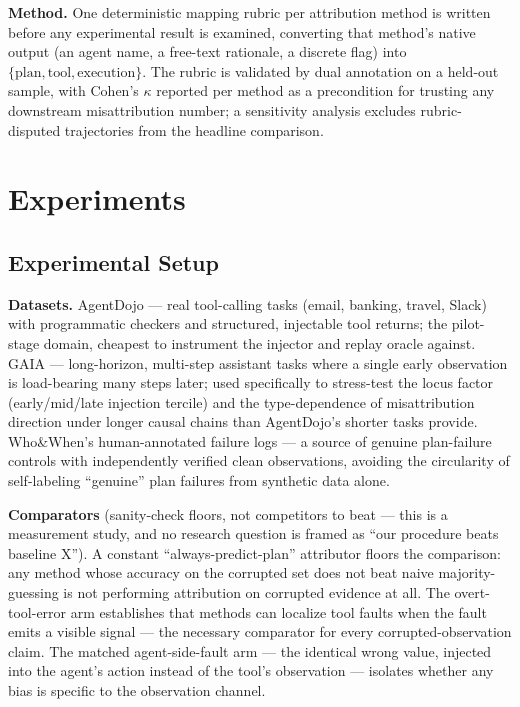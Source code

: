 \documentclass[11pt]{article}
\begin{document}
\textbf{Method.} One deterministic mapping rubric per attribution method is written before any experimental result is examined, converting that method's native output (an agent name, a free-text rationale, a discrete flag) into $\{\text{plan}, \text{tool}, \text{execution}\}$. The rubric is validated by dual annotation on a held-out sample, with Cohen's $\kappa$ reported per method as a precondition for trusting any downstream misattribution number; a sensitivity analysis excludes rubric-disputed trajectories from the headline comparison.

\section{Experiments}

\subsection{Experimental Setup}

\textbf{Datasets.} AgentDojo \citep{AgentDojo240613352} --- real tool-calling tasks (email, banking, travel, Slack) with programmatic checkers and structured, injectable tool returns; the pilot-stage domain, cheapest to instrument the injector and replay oracle against. GAIA \citep{GAIA231112983} --- long-horizon, multi-step assistant tasks where a single early observation is load-bearing many steps later; used specifically to stress-test the locus factor (early/mid/late injection tercile) and the type-dependence of misattribution direction under longer causal chains than AgentDojo's shorter tasks provide. Who\&When's \citep{WhoWhenGazlTYxZss} human-annotated failure logs --- a source of genuine plan-failure controls with independently verified clean observations, avoiding the circularity of self-labeling ``genuine'' plan failures from synthetic data alone.

\textbf{Comparators} (sanity-check floors, not competitors to beat --- this is a measurement study, and no research question is framed as ``our procedure beats baseline X''). A constant ``always-predict-plan'' attributor floors the comparison: any method whose accuracy on the corrupted set does not beat naive majority-guessing is not performing attribution on corrupted evidence at all. The overt-tool-error arm establishes that methods can localize tool faults when the fault emits a visible signal --- the necessary comparator for every corrupted-observation claim. The matched agent-side-fault arm --- the identical wrong value, injected into the agent's action instead of the tool's observation --- isolates whether any bias is specific to the observation channel.
\end{document}
